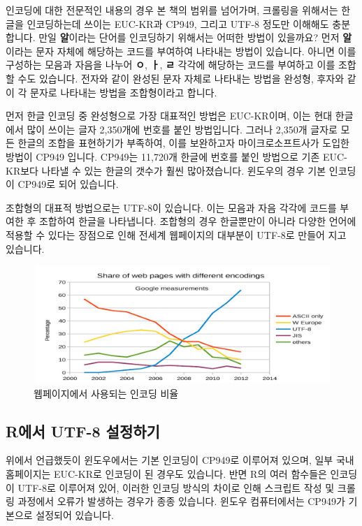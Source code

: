 \documentclass[12pt,]{book}
\begin{document}
인코딩에 대한 전문적인 내용의 경우 본 책의 범위를 넘어가며, 크롤링을 위해서는 한글을 인코딩하는데 쓰이는 EUC-KR과 CP949, 그리고 UTF-8 정도만 이해해도 충분합니다. 만일 \textbf{알}이라는 단어를 인코딩하기 위해서는 어떠한 방법이 있을까요? 먼저 \textbf{알}이라는 문자 자체에 해당하는 코드를 부여하여 나타내는 방법이 있습니다. 아니면 이를 구성하는 모음과 자음을 나누어 \textbf{ㅇ}, \textbf{ㅏ}, \textbf{ㄹ} 각각에 해당하는 코드를 부여하고 이를 조합할 수도 있습니다. 전자와 같이 완성된 문자 자체로 나타내는 방법을 완성형, 후자와 같이 각 문자로 나타내는 방법을 조합형이라고 합니다.

먼저 한글 인코딩 중 완성형으로 가장 대표적인 방법은 EUC-KR이며, 이는 현대 한글에서 많이 쓰이는 글자 2,350개에 번호를 붙인 방법입니다. 그러나 2,350개 글자로 모든 한글의 조합을 표현하기가 부족하여, 이를 보완하고자 마이크로소프트사가 도입한 방법이 CP949 입니다. CP949는 11,720개 한글에 번호를 붙인 방법으로 기존 EUC-KR보다 나타낼 수 있는 한글의 갯수가 훨씬 많아졌습니다. 윈도우의 경우 기본 인코딩이 CP949로 되어 있습니다.

조합형의 대표적 방법으로는 UTF-8이 있습니다. 이는 모음과 자음 각각에 코드를 부여한 후 조합하여 한글을 나타냅니다. 조합형의 경우 한글뿐만이 아니라 다양한 언어에 적용할 수 있다는 장점으로 인해 전세계 웹페이지의 대부분이 UTF-8로 만들어 지고 있습니다.

\begin{figure}[h]

{\centering \includegraphics[width=0.7\linewidth]{images/encoding_ratio} 

}

\caption{웹페이지에서 사용되는 인코딩 비율}\label{fig:unnamed-chunk-3}
\end{figure}

\hypertarget{r-utf-8--1}{%
\subsection{R에서 UTF-8 설정하기}\label{r-utf-8--1}}

위에서 언급했듯이 윈도우에서는 기본 인코딩이 CP949로 이루어져 있으며, 일부 국내 홈페이지는 EUC-KR로 인코딩이 된 경우도 있습니다. 반면 R의 여러 함수들은 인코딩이 UTF-8로 이루어져 있어, 이러한 인코딩 방식의 차이로 인해 스크립트 작성 및 크롤링 과정에서 오류가 발생하는 경우가 종종 있습니다. 윈도우 컴퓨터에서는 CP949가 기본으로 설정되어 있습니다.
\end{document}
